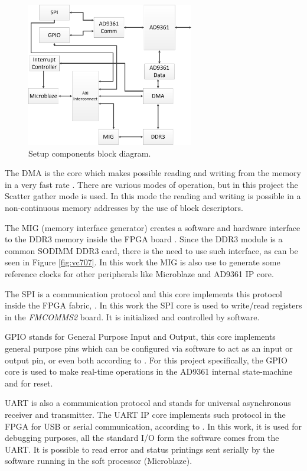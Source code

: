 \begin{figure}[htbp]
    \centering
    \includegraphics[width=0.65\textwidth]{./figures/setup_ip}
    \caption{ Setup components block diagram.
    \label{fig:setupip}}
\end{figure}


The DMA is the core which makes possible reading and writing from the memory
in a very fast rate \cite{xilinx:axidma}. There are various modes of
operation, but in this project the Scatter gather mode is used. In this mode
the reading and writing is possible in a non-continuous memory addresses by
the use of block descriptors.

The MIG (memory interface generator) creates a software and hardware interface
to the DDR3 memory inside the FPGA board \cite{xilinx:mig7}. Since the DDR3
module is a common SODIMM DDR3 card, there is the need to use such interface, as
can be seen in Figure \ref{fig:vc707}. In this work the MIG is also use to
generate some reference clocks for other peripherals like Microblaze and AD9361
IP core.

The SPI is a communication protocol and this core implements this protocol
inside the FPGA fabric, \cite{xilinx:axiquadspi}. In this work the SPI core
is used to write/read registers in the \emph{FMCOMMS2} board. It is
initialized and controlled by software.

GPIO stands for General Purpose Input and Output, this core implements general
purpose pins which can be configured via software to act as an input or output
pin, or even both according to \cite{xilinx:axigpio}. For this project
specifically, the GPIO core is used to make real-time operations in the AD9361
internal state-machine and for reset.

UART is also a communication protocol and stands for universal asynchronous
receiver and transmitter. The UART IP core implements such protocol in the
FPGA for USB or serial communication, according to \cite{xilinx:axiuart}. In
this work, it is used for debugging purposes, all the standard I/O form the
software comes from the UART. It is possible to read error and status
printings sent serially by the software running in the soft processor
(Microblaze).

